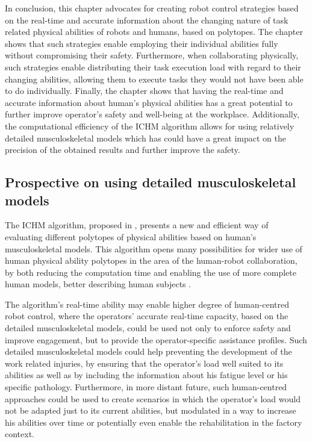 In conclusion, this chapter advocates for creating robot control strategies based on the real-time and accurate information about the changing nature of task related physical abilities of robots and humans, based on polytopes. The chapter shows that such strategies enable employing their individual abilities fully without compromising their safety. Furthermore, when collaborating physically, such strategies enable distributing their task execution load with regard to their changing abilities, allowing them to execute tasks they would not have been able to do individually. Finally, the chapter shows that having the real-time and accurate information about human's physical abilities has a great potential to further improve operator's safety and well-being at the workplace. Additionally, the computational efficiency of the ICHM algorithm allows for using relatively detailed musculoskeletal models which has could have a great impact on the precision of the obtained results and further improve the safety. 


\subsection{Prospective on using detailed musculoskeletal models}
\label{sec:human_robot_prospective}

The ICHM algorithm, proposed in , presents a new and efficient way of evaluating different polytopes of physical abilities based on human's musculoskeletal models. This algorithm opens many possibilities for wider use of human physical ability polytopes in the area of the human-robot collaboration, by both reducing the computation time and enabling the use of more complete human models, better describing human subjects \cite{sohn2019effects}. 

The algorithm's real-time ability may enable higher degree of human-centred robot control, where the operators' accurate real-time capacity, based on the detailed musculoskeletal models, could be used not only to enforce safety and improve engagement, but to provide the operator-specific assistance profiles. Such detailed musculoskeletal models could help preventing the development of the work related injuries, by ensuring that the operator's load well suited to its abilities as well as by including the information about his fatigue level \cite{Bolghanabadi2014fatigue} or his specific pathology. Furthermore, in more distant future, such human-centred approaches could be used to create scenarios in which the operator's load would not be adapted just to its current abilities, but modulated in a way to increase his abilities over time or potentially even enable the rehabilitation in the factory context. 


